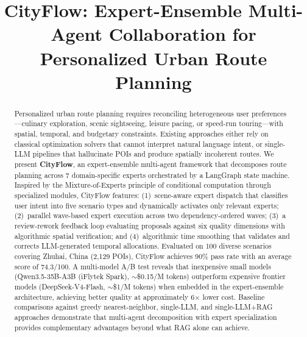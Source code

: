 \documentclass[journal]{IEEEtran}
\begin{document}
\title{CityFlow: Expert-Ensemble Multi-Agent Collaboration for Personalized Urban Route Planning}

\author{
}


\maketitle

\begin{abstract}
Personalized urban route planning requires reconciling heterogeneous user preferences---culinary exploration, scenic sightseeing, leisure pacing, or speed-run touring---with spatial, temporal, and budgetary constraints. Existing approaches either rely on classical optimization solvers that cannot interpret natural language intent, or single-LLM pipelines that hallucinate POIs and produce spatially incoherent routes. We present \textbf{CityFlow}, an expert-ensemble multi-agent framework that decomposes route planning across 7 domain-specific experts orchestrated by a LangGraph state machine. Inspired by the Mixture-of-Experts principle of conditional computation through specialized modules, CityFlow features: (1)~scene-aware expert dispatch that classifies user intent into five scenario types and dynamically activates only relevant experts; (2)~parallel wave-based expert execution across two dependency-ordered waves; (3)~a review-rework feedback loop evaluating proposals against six quality dimensions with algorithmic spatial verification; and (4)~algorithmic time smoothing that validates and corrects LLM-generated temporal allocations. Evaluated on 100 diverse scenarios covering Zhuhai, China (2,129 POIs), CityFlow achieves 90\% pass rate with an average score of 74.3/100. A multi-model A/B test reveals that inexpensive small models (Qwen3.5-35B-A3B (iFlytek Spark), ${\sim}$\$0.15/M tokens) outperform expensive frontier models (DeepSeek-V4-Flash, ${\sim}$\$1/M tokens) when embedded in the expert-ensemble architecture, achieving better quality at approximately 6$\times$ lower cost. Baseline comparisons against greedy nearest-neighbor, single-LLM, and single-LLM+RAG approaches demonstrate that multi-agent decomposition with expert specialization provides complementary advantages beyond what RAG alone can achieve.
\end{abstract}
\end{document}
